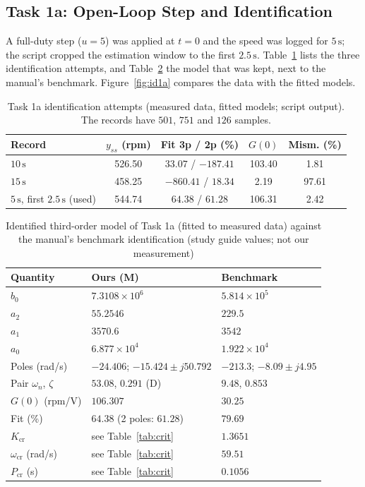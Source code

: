 \documentclass[lettersize,journal]{IEEEtran}
\newcommand{\Kcr}{K_{\mathrm{cr}}}
\newcommand{\wcr}{\omega_{\mathrm{cr}}}
\newcommand{\Pcr}{P_{\mathrm{cr}}}
\begin{document}
\subsection{Task 1a: Open-Loop Step and Identification}
\label{sec:t1a}
A full-duty step ($u=5$) was applied at $t=0$ and the speed was logged for $5\,\text{s}$; the script cropped the estimation window to the first $2.5\,\text{s}$. Table~\ref{tab:idattempts} lists the three identification attempts, and Table~\ref{tab:model} the model that was kept, next to the manual's benchmark. Figure~\ref{fig:id1a} compares the data with the fitted models.

\begin{table}[H]
\centering
\caption{Task 1a identification attempts (measured data, fitted models; script output). The records have $501$, $751$ and $126$ samples.}
\label{tab:idattempts}
\footnotesize
\setlength{\tabcolsep}{3pt}
\begin{tabular}{@{}lcccc@{}}
\toprule
Record & $y_{ss}$ (rpm) & Fit 3p / 2p (\%) & $G(0)$ & Mism. (\%) \\
\midrule
$10\,\text{s}$ & 526.50 & $33.07$ / $-187.41$ & 103.40 & 1.81 \\
$15\,\text{s}$ & 458.25 & $-860.41$ / $18.34$ & 2.19 & 97.61 \\
$5\,\text{s}$, first $2.5\,\text{s}$ (used) & 544.74 & $64.38$ / $61.28$ & 106.31 & 2.42 \\
\bottomrule
\end{tabular}
\end{table}

\begin{table}[H]
\centering
\caption{Identified third-order model of Task 1a (fitted to measured data) against the manual's benchmark identification (study guide values; not our measurement)}
\label{tab:model}
\footnotesize
\begin{tabular}{@{}p{2.3cm}p{3.1cm}p{2.5cm}@{}}
\toprule
Quantity & Ours (M) & Benchmark \\
\midrule
$b_0$ & $7.3108\times10^{6}$ & $5.814\times10^{5}$ \\
$a_2$ & $55.2546$ & $229.5$ \\
$a_1$ & $3570.6$ & $3542$ \\
$a_0$ & $6.877\times10^{4}$ & $1.922\times10^{4}$ \\
Poles (rad/s) & $-24.406$; $-15.424\pm j50.792$ & $-213.3$; $-8.09\pm j4.95$ \\
Pair $\omega_n$, $\zeta$ & $53.08$, $0.291$ (D) & $9.48$, $0.853$ \\
$G(0)$ (rpm/V) & $106.307$ & $30.25$ \\
Fit (\%) & $64.38$ (2 poles: $61.28$) & $79.69$ \\
$\Kcr$ & see Table~\ref{tab:crit} & $1.3651$ \\
$\wcr$ (rad/s) & see Table~\ref{tab:crit} & $59.51$ \\
$\Pcr$ (s) & see Table~\ref{tab:crit} & $0.1056$ \\
\bottomrule
\end{tabular}
\end{table}
\end{document}
